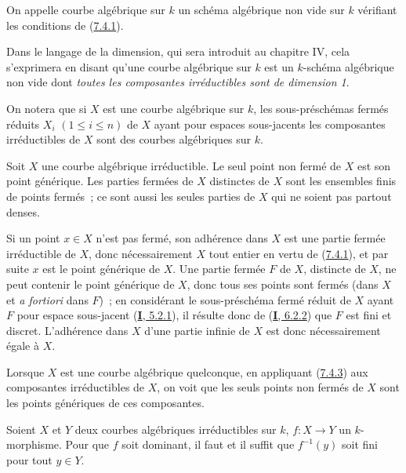 \begin{definition}[7.4.2]
\label{II.7.4.2-fr}
On appelle \textup{courbe algébrique} sur $k$ un \textup{schéma} algébrique non vide sur $k$
vérifiant les conditions de \textup{(\hyperref[II.7.4.1-fr]{7.4.1})}.
\end{definition}

Dans le langage de la dimension, qui sera introduit au chapitre IV, cela
s'exprimera en disant qu'une courbe algébrique sur $k$ est un $k$-schéma
algébrique non vide dont \emph{toutes les composantes irréductibles sont de
dimension 1}.

On notera que si $X$ est une courbe algébrique sur $k$, les sous-préschémas
fermés réduits $X_i$ $(1\leq i\leq n)$ de $X$ ayant pour espaces sous-jacents
les composantes irréductibles de $X$ sont des courbes algébriques sur $k$.

\begin{corollary}[7.4.3]
\label{II.7.4.3-fr}
Soit $X$ une courbe algébrique irréductible. Le seul point non fermé de $X$ est
son point générique. Les parties fermées de $X$ distinctes de $X$ sont les
ensembles finis de points fermés~; ce sont aussi les seules parties de $X$ qui
ne soient pas partout denses.
\end{corollary}

Si un point $x\in X$ n'est pas fermé, son adhérence dans $X$ est une partie
fermée irréductible de $X$, donc nécessairement $X$ tout entier en vertu de
(\hyperref[II.7.4.1-fr]{7.4.1}), et par suite $x$ est le point générique de
$X$. Une partie fermée $F$ de $X$, distincte de $X$, ne peut contenir
le point générique de $X$, donc tous ses points sont fermés (dans $X$ et
\emph{a fortiori} dans $F$)~; en considérant le sous-préschéma fermé réduit de
$X$ ayant $F$ pour espace sous-jacent (\hyperref[I.5.2.1-fr]{\textbf{I}, 5.2.1}), il
résulte donc de (\hyperref[I.6.2.2-fr]{\textbf{I}, 6.2.2}) que $F$ est fini et discret.
L'adhérence dans $X$ d'une partie infinie de $X$ est donc nécessairement égale
à $X$.

Lorsque $X$ est une courbe algébrique quelconque, en appliquant
(\hyperref[II.7.4.3-fr]{7.4.3}) aux composantes irréductibles de $X$, on voit
que les seuls points non fermés de $X$ sont les points génériques de ces
composantes.

\begin{corollary}[7.4.4]
\label{II.7.4.4-fr}
Soient $X$ et $Y$ deux courbes algébriques irréductibles sur $k$, $f:X\to Y$
un $k$-morphisme. Pour que $f$ soit dominant, il faut et il suffit que
$f^{-1}(y)$ soit fini pour tout $y\in Y$.
\end{corollary}

